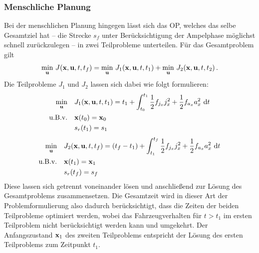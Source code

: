 \subsubsection{Menschliche Planung}\label{subsubsec:Mensch}
Bei der menschlichen Planung hingegen lässt sich das \gls{OP}, welches das selbe Gesamtziel hat -- die Strecke $s_f$ unter Berücksichtigung der Ampelphase möglichst schnell zurückzulegen -- in zwei Teilprobleme unterteilen. Für das Gesamtproblem gilt
\begin{equation}
\min_{\boldsymbol{\mathrm{u}}} \, J(\boldsymbol{\mathrm{x}},\boldsymbol{\mathrm{u}},t,t_f) = \min_{\boldsymbol{\mathrm{u}}} \, J_1(\boldsymbol{\mathrm{x}},\boldsymbol{\mathrm{u}},t,t_1) + \min_{\boldsymbol{\mathrm{u}}} \, J_2(\boldsymbol{\mathrm{x}},\boldsymbol{\mathrm{u}},t,t_2)\,.
\end{equation}
Die Teilprobleme $J_1$ und $J_2$ lassen sich dabei wie folgt formulieren:
	\begin{align}
	\min_{\boldsymbol{\mathrm{u}}} \quad & J_1(\boldsymbol{\mathrm{x}},\boldsymbol{\mathrm{u}},t,t_1) = t_1 + \int_{t_0}^{t_1}\frac{1}{2}f_{j_x} j_x^2 + \frac{1}{2}f_{a_x} a_x^2~\textrm{d}{t} \\
	\textrm{u.B.v.} \quad & \boldsymbol{\mathrm{x}}(t_0) = \boldsymbol{\mathrm{x}}_0 \\
	& s_r(t_1) = s_1 
	\end{align}
	\begin{align}
	\min_{\boldsymbol{\mathrm{u}}} \quad & J_2(\boldsymbol{\mathrm{x}},\boldsymbol{\mathrm{u}},t,t_f) = (t_f - t_1) + \int_{t_1}^{t_f}\frac{1}{2}f_{j_x} j_x^2 + \frac{1}{2}f_{a_x} a_x^2~\textrm{d}{t} \\
	\textrm{u.B.v.} \quad & \boldsymbol{\mathrm{x}}(t_1) = \boldsymbol{\mathrm{x}}_1 \\
	& s_r(t_f) = s_f 
	\end{align}
Diese lassen sich getrennt voneinander lösen und anschließend zur Lösung des Gesamtproblems zusammensetzen. Die Gesamtzeit wird in dieser Art der Problemformulierung also dadurch berücksichtigt, dass die Zeiten der beiden Teilprobleme optimiert werden, wobei das Fahrzeugverhalten für $t>t_1$ im ersten Teilproblem nicht berücksichtigt werden kann und umgekehrt. Der Anfangszustand $\boldsymbol{\mathrm{x}}_1$ des zweiten Teilproblems entspricht der Lösung des ersten Teilproblems zum Zeitpunkt $t_1$.

